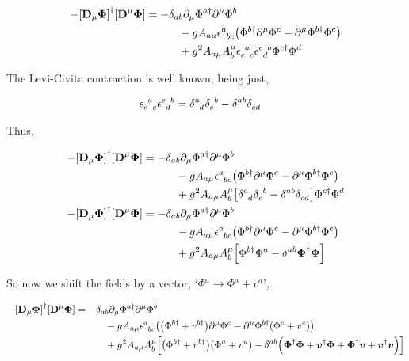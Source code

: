 \begin{align}
    -\qty[\vb D_\mu \boldsymbol\Phi]^\dagger\qty[\vb D^\mu\boldsymbol\Phi]&=-\delta_{ab}\partial_\mu\Phi^{a\dagger}\partial^\mu\Phi^b\nonumber\\
    &\quad\quad\quad
    -gA_{a\mu}\tensor{\epsilon}{^a_b_c}\qty(\Phi^{b\dagger}\partial^\mu\Phi^c-\partial^\mu\Phi^{b\dagger}\Phi^c)\nonumber\\
    &\quad\quad\quad+g^2A_{a\mu}A_b^\mu
    \tensor{\epsilon}{_e^a_c}\tensor{\epsilon}{^e_d^b}
    \Phi^{c\dagger}\Phi^d\nonumber
\end{align}

The Levi-Civita contraction is well known, being just,

\begin{align}
    \tensor{\epsilon}{_e^a_c}\tensor{\epsilon}{^e_d^b}&=\tensor{\delta}{^a_d}\tensor{\delta}{_c^b}-\tensor{\delta}{^a^b}\tensor{\delta}{_c_d}\nonumber
\end{align}

Thus,

\begin{align}
    -\qty[\vb D_\mu \boldsymbol\Phi]^\dagger\qty[\vb D^\mu\boldsymbol\Phi]&=-\delta_{ab}\partial_\mu\Phi^{a\dagger}\partial^\mu\Phi^b\nonumber\\
    &\quad\quad\quad
    -gA_{a\mu}\tensor{\epsilon}{^a_b_c}\qty(\Phi^{b\dagger}\partial^\mu\Phi^c-\partial^\mu\Phi^{b\dagger}\Phi^c)\nonumber\\
    &\quad\quad\quad+g^2A_{a\mu}A_b^\mu
    \qty[\tensor{\delta}{^a_d}\tensor{\delta}{_c^b}-\tensor{\delta}{^a^b}\tensor{\delta}{_c_d}]
    \Phi^{c\dagger}\Phi^d\nonumber\\
    -\qty[\vb D_\mu \boldsymbol\Phi]^\dagger\qty[\vb D^\mu\boldsymbol\Phi]&=-\delta_{ab}\partial_\mu\Phi^{a\dagger}\partial^\mu\Phi^b\nonumber\\
    &\quad\quad\quad
    -gA_{a\mu}\tensor{\epsilon}{^a_b_c}\qty(\Phi^{b\dagger}\partial^\mu\Phi^c-\partial^\mu\Phi^{b\dagger}\Phi^c)\nonumber\\
    &\quad\quad\quad+g^2A_{a\mu}A_b^\mu
    \qty[\Phi^{b\dagger}\Phi^a-\tensor{\delta}{^a^b}\boldsymbol\Phi^{\dagger}\boldsymbol\Phi]\nonumber
\end{align}

So now we shift the fields by a vector, `$\Phi^a\rightarrow \Phi^a+v^a$',

\begin{align}
    -\qty[\vb D_\mu \boldsymbol\Phi]^\dagger\qty[\vb D^\mu\boldsymbol\Phi]&=-\delta_{ab}\partial_\mu\Phi^{a\dagger}\partial^\mu\Phi^b\nonumber\\
    &\quad\quad\quad
    -gA_{a\mu}\tensor{\epsilon}{^a_b_c}\qty(\qty(\Phi^{b\dagger}+v^{b\dagger})\partial^\mu\Phi^c-\partial^\mu\Phi^{b\dagger}\qty(\Phi^c+v^c))\nonumber\\
    &\quad\quad\quad+g^2A_{a\mu}A_b^\mu
    \qty[\qty(\Phi^{b\dagger}+v^{b\dagger})\qty(\Phi^a+v^a)
    -\tensor{\delta}{^a^b}\qty(\boldsymbol\Phi^{\dagger}\boldsymbol\Phi+\boldsymbol v^\dagger\boldsymbol \Phi
    +\boldsymbol\Phi^\dagger\boldsymbol v+\boldsymbol v^\dagger\boldsymbol v)]\nonumber
\end{align}

